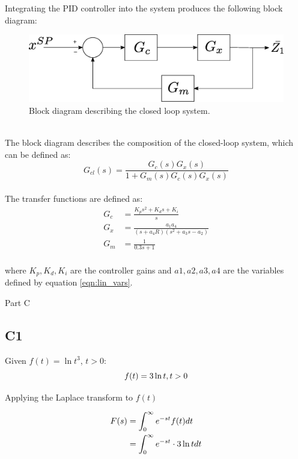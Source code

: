 \documentclass[a4paper,10pt,reqno]{amsart}
\makeatletter
\def\section{\@startsection{section}{1}%
  \z@{.7\linespacing\@plus\linespacing}{.5\linespacing}%
  {\bfseries\scshape\centering}}
\numberwithin{equation}{section}
\makeatother
\begin{document}
Integrating the PID controller into the system produces the following block diagram:
\\
\begin{figure}[h]
 \centering
 \includegraphics[width=0.8\linewidth]{Figures/Controller_Loop.eps}
 \caption{Block diagram describing the closed loop system.}
 \label{fig:B6Diagram}
\end{figure}
\\
The block diagram describes the composition of the closed-loop system, which can be defined as: \begin{equation}
    G_{cl}(s) = \frac{G_c(s)G_x(s)}{1 + G_m(s)G_c(s)G_x(s)}
\end{equation}
\\
The transfer functions are defined as:
\begin{align*}
    G_c &{}={} \frac{K_ps^2+K_ds+K_i}{s}
    \\
    G_x &{}={} \frac{a_1a_4}{(s+a_4R)(s^2+a_3s-a_2)}
    \\
    G_m &{}={} \frac{1}{0.3s+1}
\end{align*}
\\
where $K_p, K_d, K_i$ are the controller gains and $a1, a2, a3, a4$ are the variables defined by equation \ref{eqn:lin_vars}.

\newpage
\section{Part C}\label{sec:C}

\subsection{C1}
\par Given $f(t) = \ln{t^3}$, $t>0$:
\begin{equation}
    f(t) = 3\ln{t}, t>0
    \notag
\end{equation}

\par Applying the Laplace transform to $f(t)$

\begin{align}
    F(s) &= \int_0^\infty e^{-st} f(t) dt
    \notag\\
    &= \int_0^\infty e^{-st} \cdot 3\ln{t} dt
    \label{eqn:C1Lap}
\end{align}
\end{document}
